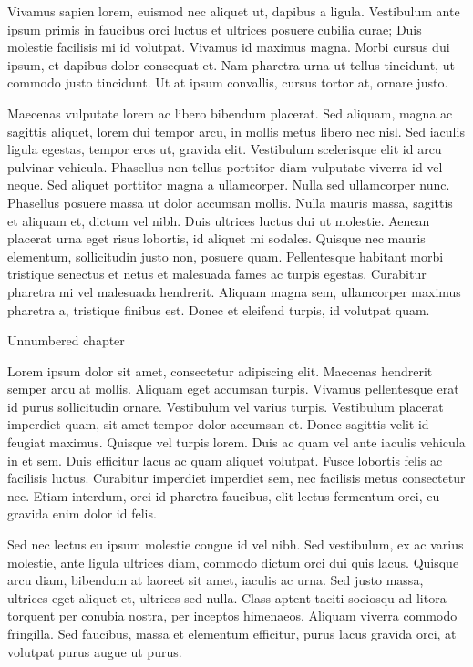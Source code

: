 Vivamus sapien lorem, euismod nec aliquet ut, dapibus a ligula. Vestibulum ante ipsum primis in faucibus orci luctus et ultrices posuere cubilia curae; Duis molestie facilisis mi id volutpat. Vivamus id maximus magna. Morbi cursus dui ipsum, et dapibus dolor consequat et. Nam pharetra urna ut tellus tincidunt, ut commodo justo tincidunt. Ut at ipsum convallis, cursus tortor at, ornare justo.

Maecenas vulputate lorem ac libero bibendum placerat. Sed aliquam, magna ac sagittis aliquet, lorem dui tempor arcu, in mollis metus libero nec nisl. Sed iaculis ligula egestas, tempor eros ut, gravida elit. Vestibulum scelerisque elit id arcu pulvinar vehicula. Phasellus non tellus porttitor diam vulputate viverra id vel neque. Sed aliquet porttitor magna a ullamcorper. Nulla sed ullamcorper nunc. Phasellus posuere massa ut dolor accumsan mollis. Nulla mauris massa, sagittis et aliquam et, dictum vel nibh. Duis ultrices luctus dui ut molestie. Aenean placerat urna eget risus lobortis, id aliquet mi sodales. Quisque nec mauris elementum, sollicitudin justo non, posuere quam. Pellentesque habitant morbi tristique senectus et netus et malesuada fames ac turpis egestas. Curabitur pharetra mi vel malesuada hendrerit. Aliquam magna sem, ullamcorper maximus pharetra a, tristique finibus est. Donec et eleifend turpis, id volutpat quam. 

\nonum\chap Unnumbered chapter



Lorem ipsum dolor sit amet, consectetur adipiscing elit. Maecenas hendrerit semper arcu at mollis. Aliquam eget accumsan turpis. Vivamus pellentesque erat id purus sollicitudin ornare. Vestibulum vel varius turpis. Vestibulum placerat imperdiet quam, sit amet tempor dolor accumsan et. Donec sagittis velit id feugiat maximus. Quisque vel turpis lorem. Duis ac quam vel ante iaculis vehicula in et sem. Duis efficitur lacus ac quam aliquet volutpat. Fusce lobortis felis ac facilisis luctus. Curabitur imperdiet imperdiet sem, nec facilisis metus consectetur nec. Etiam interdum, orci id pharetra faucibus, elit lectus fermentum orci, eu gravida enim dolor id felis.

Sed nec lectus eu ipsum molestie congue id vel nibh. Sed vestibulum, ex ac varius molestie, ante ligula ultrices diam, commodo dictum orci dui quis lacus. Quisque arcu diam, bibendum at laoreet sit amet, iaculis ac urna. Sed justo massa, ultrices eget aliquet et, ultrices sed nulla. Class aptent taciti sociosqu ad litora torquent per conubia nostra, per inceptos himenaeos. Aliquam viverra commodo fringilla. Sed faucibus, massa et elementum efficitur, purus lacus gravida orci, at volutpat purus augue ut purus.

